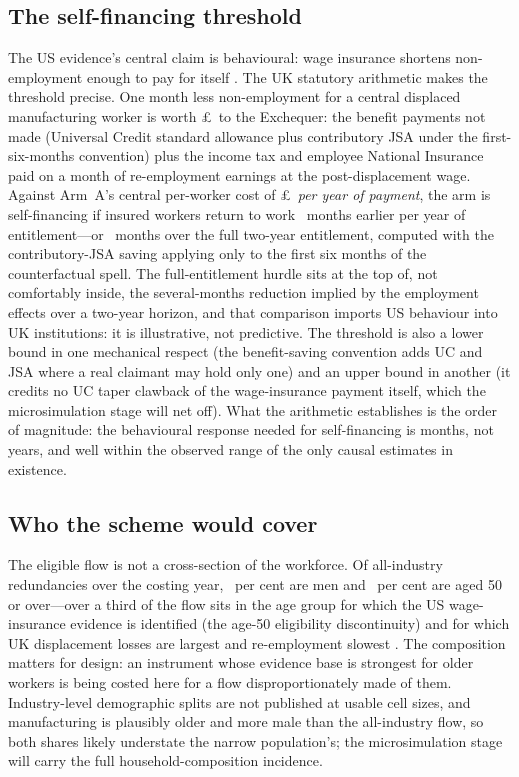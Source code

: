 \subsection{The self-financing threshold}\label{sec:results-breakeven}

The US evidence's central claim is behavioural: wage insurance shortens
non-employment enough to pay for itself \citep{hyman2024}. The UK
statutory arithmetic makes the threshold precise. One month less
non-employment for a central displaced manufacturing worker is worth
\pounds\TaaFiscalPerMonth\ to the Exchequer: the benefit payments not
made (Universal Credit standard allowance plus contributory JSA under
the first-six-months convention) plus the income tax and employee
National Insurance paid on a month of re-employment earnings at the
post-displacement wage. Against Arm~A's central per-worker cost of
\pounds\TaaWageInsPerWorkerCentralManuf\ \emph{per year of payment},
the arm is self-financing if insured workers return to work
\TaaBreakEvenMonths\ months earlier per year of entitlement---or
\TaaBreakEvenMonthsFull\ months over the full two-year entitlement,
computed with the contributory-JSA saving applying only to the first six
months of the counterfactual spell. The full-entitlement hurdle sits at
the top of, not comfortably inside, the several-months reduction implied
by the \citet{hyman2024} employment effects over a two-year horizon, and
that comparison imports US behaviour into UK institutions: it is
illustrative, not predictive. The threshold is also a lower bound in one
mechanical respect (the benefit-saving convention adds UC and JSA where
a real claimant may hold only one) and an upper bound in another (it
credits no UC taper clawback of the wage-insurance payment itself, which
the microsimulation stage will net off). What the arithmetic
establishes is the order of magnitude: the behavioural response needed
for self-financing is months, not years, and well within the observed
range of the only causal estimates in existence.

\subsection{Who the scheme would cover}\label{sec:results-composition}

The eligible flow is not a cross-section of the workforce. Of
all-industry redundancies over the costing year, \TaaEligMaleShare\ per
cent are men and \TaaEligFiftyPlusShare\ per cent are aged 50 or
over---over a third of the flow sits in the age group for which the US
wage-insurance evidence is identified (the age-50 eligibility
discontinuity) and for which UK displacement losses are largest and
re-employment slowest \citep{hijzen2010}. The composition matters for
design: an instrument whose evidence base is strongest for older
workers is being costed here for a flow disproportionately made of
them. Industry-level demographic splits are not published at usable
cell sizes, and manufacturing is plausibly older and more male than the
all-industry flow, so both shares likely understate the narrow
population's; the microsimulation stage will carry the full
household-composition incidence.

